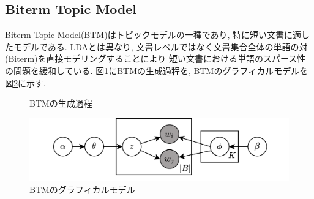 \documentclass{ltjarticle}
\begin{document}
\subsection{Biterm Topic Model}
Biterm Topic Model(BTM)はトピックモデルの一種であり, 特に短い文書に適したモデルである. 
LDAとは異なり, 文書レベルではなく文書集合全体の単語の対(Biterm)を直接モデリングすることにより
短い文書における単語のスパース性の問題を緩和している. 
図\ref{fig:BTM生成過程}にBTMの生成過程を, BTMのグラフィカルモデルを図\ref{fig:BTMのグラフィカルモデル}に示す. \\
\begin{figure}[h]
    \centering
    \caption{BTMの生成過程}
    \label{fig:BTM生成過程}
\end{figure}
\begin{figure}[ht]
    \centering
    \includegraphics[width = 12cm]{images/BTMグラフィカルモデル.drawio.png}
    \caption{BTMのグラフィカルモデル}
    \label{fig:BTMのグラフィカルモデル}
\end{figure}
\end{document}
